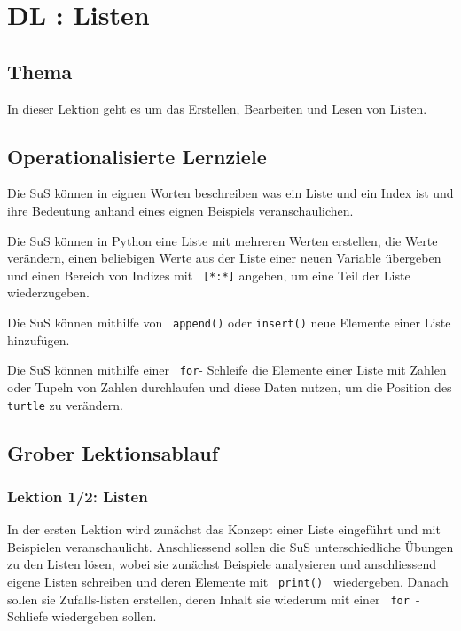 \section{DL \themycounter: Listen}
\begin{myExBox}[title=DL \themycounter]
\subsection*{Thema}
In dieser Lektion geht es um das Erstellen, Bearbeiten und Lesen von Listen.


\subsection*{Operationalisierte Lernziele}
\begin{todolist}
    \item Die SuS können in eignen Worten beschreiben was ein Liste und ein Index ist und ihre Bedeutung anhand eines eignen Beispiels veranschaulichen.
    \item Die SuS können in Python eine Liste mit mehreren Werten erstellen, die Werte verändern, einen beliebigen Werte aus der Liste einer neuen Variable übergeben und einen Bereich von Indizes mit \lstinline| [*:*]| angeben, um eine Teil der Liste wiederzugeben.
    \item Die SuS können mithilfe von \lstinline| append()| oder \lstinline|insert()| neue Elemente einer Liste hinzufügen.
    \item Die SuS können mithilfe einer \lstinline| for|-  Schleife die Elemente einer Liste mit Zahlen oder Tupeln von Zahlen durchlaufen und diese Daten nutzen, um die Position des \lstinline|turtle| zu verändern.
\end{todolist}

\subsection*{Grober Lektionsablauf}
\subsubsection*{Lektion 1/2: Listen}
In der ersten Lektion wird zunächst das Konzept einer Liste eingeführt und mit Beispielen veranschaulicht. Anschliessend sollen die SuS unterschiedliche Übungen zu den Listen lösen, wobei sie zunächst Beispiele analysieren und anschliessend eigene Listen schreiben und deren Elemente mit \lstinline| print() | wiedergeben. Danach sollen sie Zufalls-listen erstellen, deren Inhalt sie wiederum mit einer \lstinline| for |-Schliefe wiedergeben sollen.


\end{myExBox}
